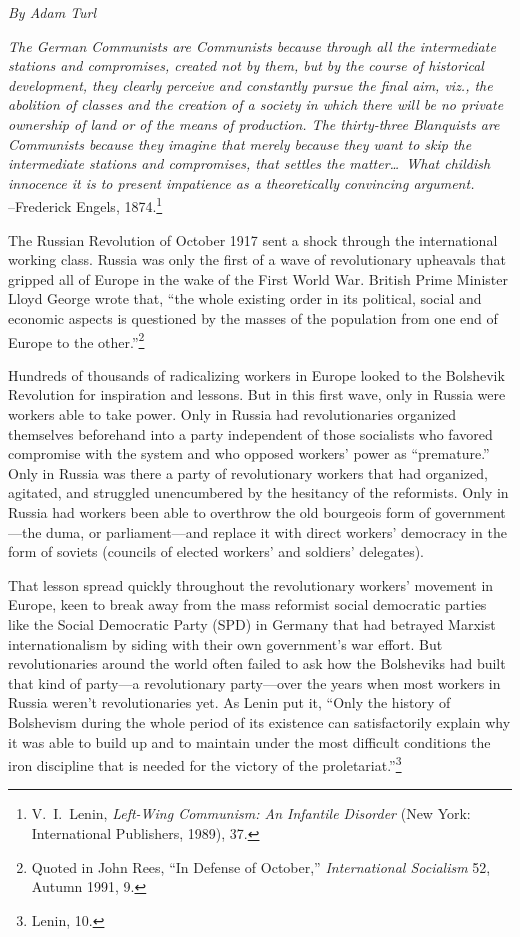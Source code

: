 \emph{By Adam Turl}

\begin{flushleft}\emph{The German Communists are Communists because through all the intermediate stations and compromises, created not by them, but by the course of historical development, they clearly perceive and constantly pursue the final aim, viz., the abolition of classes and the creation of a society in which there will be no private ownership of land or of the means of production. The thirty-three Blanquists are Communists because they imagine that merely because they want to skip the intermediate stations and compromises, that settles the matter\ldots\ What childish innocence it is to present impatience as a theoretically convincing argument.}\\
--Frederick Engels, 1874.\footnote{V.\ I.\ Lenin, \emph{Left-Wing Communism: An Infantile Disorder} (New York: International Publishers, 1989), 37.}
\end{flushleft}

The Russian Revolution of October 1917 sent a shock through the international working class. Russia was only the first of a wave of revolutionary upheavals that gripped all of Europe in the wake of the First World War. British Prime Minister Lloyd George wrote that, ``the whole existing order in its political, social and economic aspects is questioned by the masses of the population from one end of Europe to the other.''\footnote{Quoted in John Rees, ``In Defense of October,'' \emph{International Socialism} 52, Autumn 1991, 9.}

Hundreds of thousands of radicalizing workers in Europe looked to the Bolshevik Revolution for inspiration and lessons. But in this first wave, only in Russia were workers able to take power. Only in Russia had revolutionaries organized themselves beforehand into a party independent of those socialists who favored compromise with the system and who opposed workers' power as ``premature.'' Only in Russia was there a party of revolutionary workers that had organized, agitated, and struggled unencumbered by the hesitancy of the reformists. Only in Russia had workers been able to overthrow the old bourgeois form of government---the duma, or parliament---and replace it with direct workers' democracy in the form of soviets (councils of elected workers' and soldiers' delegates).

That lesson spread quickly throughout the revolutionary workers' movement in Europe, keen to break away from the mass reformist social democratic parties like the Social Democratic Party (SPD) in Germany that had betrayed Marxist internationalism by siding with their own government's war effort. But revolutionaries around the world often failed to ask how the Bolsheviks had built that kind of party---a revolutionary party---over the years when most workers in Russia weren't revolutionaries yet. As Lenin put it, ``Only the history of Bolshevism during the whole period of its existence can satisfactorily explain why it was able to build up and to maintain under the most difficult conditions the iron discipline that is needed for the victory of the proletariat.''\footnote{Lenin, 10.}

